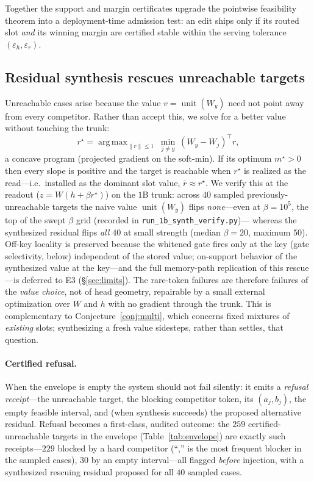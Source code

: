 \documentclass[11pt]{article}
\theoremstyle{remark}
\DeclareMathOperator*{\argmax}{arg\,max}
\DeclareMathOperator{\unit}{unit}
\begin{document}
\noindent Together the support and margin certificates upgrade the pointwise
feasibility theorem into a deployment-time admission test: an edit ships only if
its routed slot \emph{and} its winning margin are certified stable within the
serving tolerance $(\varepsilon_h,\varepsilon_r)$.

\subsection{Residual synthesis rescues unreachable targets}
\label{sec:synth}
Unreachable cases arise because the value $v=\unit(W_y)$
need not point away from every competitor. Rather than accept this, we solve for a
better value without touching the trunk:
\[ r^{\star}=\argmax_{\lVert r\rVert\le1}\ \min_{j\ne y}\ (W_y-W_j)^{\top}r, \]
a concave program (projected gradient on the soft-min). If its optimum
$m^{\star}>0$ then every slope is positive and the target is reachable when
$r^{\star}$ is realized as the read---i.e.\ installed as the dominant slot value,
$\bar r\approx r^{\star}$. We verify
this at the readout ($z=W(h+\beta r^{\star})$) on the $1$B trunk: across $40$
sampled previously-unreachable
targets the naive value $\unit(W_y)$ flips \emph{none}---even at $\beta=10^{5}$, the top of the swept $\beta$ grid (recorded in \texttt{run\_1b\_synth\_verify.py})---
whereas the synthesized residual flips \emph{all $40$} at small strength (median
$\beta=20$, maximum $50$). Off-key locality is preserved because the
whitened gate fires only at the key (gate selectivity, below) independent of the
stored value; on-support behavior of the synthesized value at the key---and the
full memory-path replication of this rescue---is deferred to E3
(\S\ref{sec:limits}). The rare-token failures are therefore failures of the \emph{value
choice}, not of head geometry, repairable by a small external optimization over
$W$ and $h$ with no gradient through the trunk. This is complementary to
Conjecture~\ref{conj:multi}, which concerns fixed mixtures of \emph{existing}
slots; synthesizing a fresh value sidesteps, rather than settles, that question.

\paragraph{Certified refusal.}
When the envelope is empty the system should not fail silently: it emits a
\emph{refusal receipt}---the unreachable target, the blocking competitor token, its
$(a_j,b_j)$, the empty feasible interval, and (when synthesis succeeds) the proposed
alternative residual. Refusal becomes a first-class, audited outcome: the $259$
certified-unreachable targets in the envelope (Table~\ref{tab:envelope}) are exactly
such receipts---$229$ blocked by a hard competitor (``,'' is the most frequent
blocker in the sampled cases), $30$ by an empty interval---all flagged
\emph{before} injection, with a synthesized rescuing residual proposed for all $40$
sampled cases.
\end{document}

